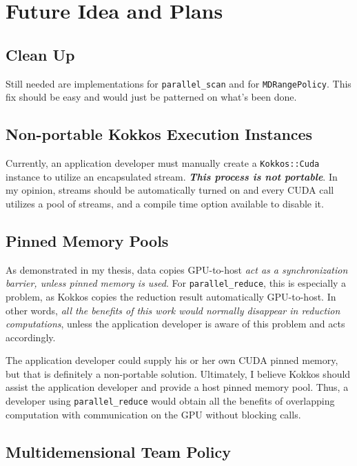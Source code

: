 \documentclass[]{article}
\begin{document}
\section{Future Idea and Plans}

\subsection{Clean Up}
Still needed are implementations for \texttt{parallel\_scan} and for \texttt{MDRangePolicy}.  This fix should be easy and would just be patterned on what's been done.

\subsection{Non-portable Kokkos Execution Instances}

Currently, an application developer must manually create a \texttt{Kokkos::Cuda} instance to utilize an encapsulated stream.  \textbf{\emph{This process is not portable}}.  In my opinion, streams should be automatically turned on and every CUDA call utilizes a pool of streams, and a compile time option available to disable it.

\subsection{Pinned Memory Pools}

As demonstrated in my thesis, data copies GPU-to-host \emph{act as a synchronization barrier, unless pinned memory is used}.   For \texttt{parallel\_reduce}, this is especially a problem, as Kokkos copies the reduction result automatically GPU-to-host. In other words, \emph{all the benefits of this work would normally disappear in reduction computations}, unless the application developer is aware of this problem and acts accordingly.  

The application developer could supply his or her own CUDA pinned memory, but that is definitely a non-portable solution.  Ultimately, I believe Kokkos should assist the application developer and provide a host pinned memory pool.  Thus, a developer using \texttt{parallel\_reduce} would obtain all the benefits of overlapping computation with communication on the GPU without blocking calls.  

\subsection{Multidemensional Team Policy}
\end{document}
